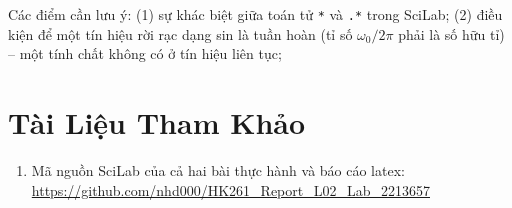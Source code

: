 \documentclass[12pt,a4paper]{article}
\begin{document}
Các điểm cần lưu ý: (1) sự khác biệt giữa toán tử \texttt{*} và \texttt{.*} trong
SciLab; (2) điều kiện để một tín hiệu rời rạc dạng sin là tuần hoàn (tỉ số
$\omega_0/2\pi$ phải là số hữu tỉ) -- một tính chất không có ở tín hiệu liên tục;

\section{Tài Liệu Tham Khảo}

\begin{enumerate}
  \item Mã nguồn SciLab của cả hai bài thực hành và báo cáo latex:
\url {https://github.com/nhd000/HK261_Report_L02_Lab_2213657}
\end{enumerate}
\end{document}
